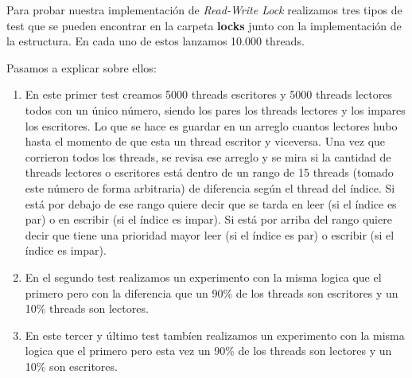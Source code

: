 Para probar nuestra implementación de \textit{Read-Write Lock} realizamos tres tipos de test que se pueden encontrar en la carpeta \textbf{locks} junto con la implementación de la estructura. En cada uno de estos lanzamos 10.000 threads.

Pasamos a explicar sobre ellos:

\begin{enumerate}
	\item En este primer test creamos 5000 threads escritores y 5000 threads lectores todos con un único número, siendo los pares los threads lectores y los impares los escritores. Lo que se hace es guardar en un arreglo cuantos lectores hubo hasta el momento de que esta un thread escritor y viceversa.
	\newline
	Una vez que corrieron todos los threads, se revisa ese arreglo y se mira si la cantidad de threads lectores o escritores está dentro de un rango de 15 threads (tomado este número de forma arbitraria) de diferencia según el thread del índice. Si está por debajo de ese rango quiere decir que se tarda en leer (si el índice es par) o en escribir (si el índice es impar). Si está por arriba del rango quiere decir que tiene una prioridad mayor leer (si el índice es par) o escribir (si el índice es impar).

	\item En el segundo test realizamos un experimento con la misma logica que el primero pero con la diferencia que un 90\% de los threads son escritores y un 10\% threads son lectores.

	\item En este tercer y último test tambíen realizamos un experimento con la misma logica que el primero pero esta vez un 90\% de los threads son lectores y un 10\% son escritores.
\end{enumerate}